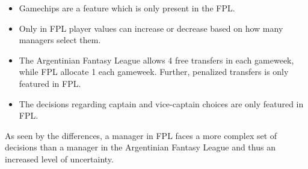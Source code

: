 \begin{itemize}
    \item Gamechips are a feature which is only present in the FPL.  
    \item Only in FPL player values can increase or decrease based on how many managers select them.
    
    \item  The Argentinian Fantasy League allows 4 free transfers in each gameweek, while FPL allocate 1 each gameweek. Further, penalized transfers is only featured in FPL.
    
    
    \begin{comment}
     The Argentinian Fantasy League allows 4 free transfers in each gameweek, while FPL allocate 1 each gameweek. Further, in FPL, each penalized transfers deducts 4 points. Therefore, a manager in the Argentinian Fantasy Football are to a greater extent guarded from factors such as injury, suspension or players not performing well. A manager in FPL is more exposed to these factors and faces a more difficult choice. If the decision to make a transfer is first made, it is likely one has to do more than one transfer to comply with the budget constraint. That is, there is a reasonable chance that in order to afford a new player, the manager also has to trade to a cheaper player in another position. By comparing player to player, it only pays off to take the 4 points hit from a penalized transfer if that player earns 4 or more points than the player which was transferred out.
     
     It calls for FPL managers to be even better skilled to pick right players to double their points.
    \end{comment}

    \item The decisions regarding captain and vice-captain choices are only featured in FPL.  
\end{itemize}

As seen by the differences, a manager in FPL faces a more complex set of decisions than a manager in the Argentinian Fantasy League and thus an increased level of uncertainty. 

\newpar


\begin{comment}
There is limited research available on optimization of a Fantasy Premier League team. However, due to the large amount of active NFL Fantasy Sports players, literature is available for both season- and weekly format. \cite{King} suggested a model for predicting points for the quarterbacks in the NFL, using Backward Stepwise regression and Support Vector regression models in his research. Further, he predicted fantasy points by use of Artificial Neural Networks. Similar approaches can be used in order to predict the performance of the Premier League players.
\end{comment}


